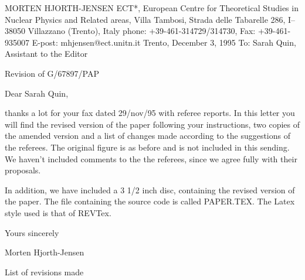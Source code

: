 
\setlength{\parindent}{0cm} 
\setlength{\parskip}{2.0ex} 
\setlength{\parsep}{0ex} 
\pagestyle{plain}
MORTEN HJORTH-JENSEN\newline
ECT*, European Centre for Theoretical Studies in Nuclear\newline
Physics and Related areas, Villa Tambosi, Strada delle
Tabarelle 286, \newline I--38050 Villazzano (Trento), Italy\newline
phone: +39-461-314729/314730, Fax: +39-461-935007\newline
E-post: mhjensen@ect.unitn.it\newline
\vspace{2cm}
\hspace{5cm} Trento, December 3,  1995\newline
To: Sarah Quin, Assistant to the Editor

\begin{center} Revision of G/67897/PAP \end{center}


Dear Sarah Quin,

thanks a lot for your fax dated 29/nov/95 with referee reports.
In this letter you will find the revised version of the paper
following your instructions,  two copies of the amended version
and a list of changes made according to the suggestions of the referees.
The original figure is as before and is not included in this sending.
We haven't included comments  to the the referees, since we agree
fully with their proposals.

In addition, we have included a 3 1/2 inch disc, containing
the revised version of the paper. The file containing the source
code is called  PAPER.TEX. The Latex style used is that
of REVTex.

\begin{center} Yours sincerely \end{center}
\begin{center} Morten Hjorth-Jensen\end{center}

\clearpage

\begin{center} List of revisions made \end{center} 


